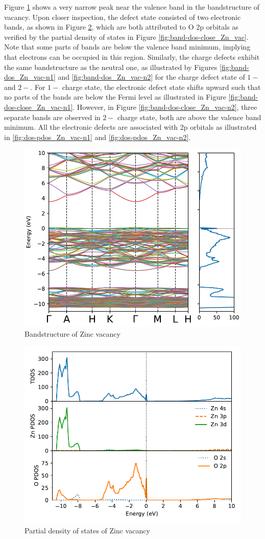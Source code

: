  Figure \ref{fig:band-dos_Zn_vac} shows a very narrow peak near the valence band in the bandstructure of  vacancy. Upon closer inspection, the defect state consisted of two electronic bands, as shown in Figure \ref{fig:dos-pdos_Zn_vac}, which are both attributed to O 2p orbitals as verified by the partial density of states in Figure \ref{fig:band-dos-close_Zn_vac}. Note that some parts of bands are below the valence band minimum, implying that electrons can be occupied in this region. Similarly, the charge defects exhibit the same bandstructure as the neutral one, as illustrated by Figures \ref{fig:band-dos_Zn_vac-n1} and \ref{fig:band-dos_Zn_vac-n2} for the charge defect state of $1-$ and $2-$.  For $1-$ charge state, the electronic defect state shifts upward such that no parts of the bands are below the Fermi level as illustrated in Figure \ref{fig:band-dos-close_Zn_vac-n1}. However, in Figure \ref{fig:band-dos-close_Zn_vac-n2}, three separate bands are observed in $2-$ charge state, both are above the valence band minimum. All the electronic defects are associated with 2p orbitals as illustrated in \ref{fig:dos-pdos_Zn_vac-n1} and \ref{fig:dos-pdos_Zn_vac-n2}.


\begin{figure}[tbh!]
	\centering
	\includegraphics[width=0.6\linewidth]{"images/rnd/band-dos_Zn_vac"}
	\caption[Bandstructure of Zinc vacancy]{Bandstructure of Zinc vacancy}
	\label{fig:band-dos_Zn_vac}
\end{figure}

\begin{figure}[tbh!]
	\centering
	\includegraphics[width=0.6\linewidth]{"images/rnd/dos-pdos_Zn_vac"}
	\caption[Partial density of states of Zinc vacancy]{Partial density of states of Zinc vacancy}
	\label{fig:dos-pdos_Zn_vac}
\end{figure}

